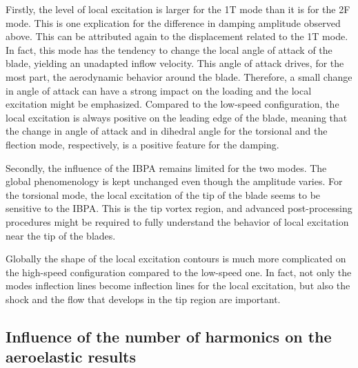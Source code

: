 Firstly, the level of local excitation is larger for the
1T mode than it is for the 2F mode. This is one explication
for the difference in damping amplitude observed above.
This can be attributed again to the displacement related to the
1T mode. In fact, this mode has the tendency to change the
local angle of attack of the blade, yielding an unadapted
inflow velocity. This angle of attack drives, for the most part,
the aerodynamic behavior around the blade. Therefore, a small
change in angle of attack can have a strong impact on the loading and
the local excitation might be emphasized.
Compared to the low-speed configuration, the local excitation
is always positive on the leading edge of the blade, meaning
that the change in angle of attack and in dihedral angle
for the torsional and the flection mode, respectively,
is a positive feature for the damping.

Secondly, the influence of the IBPA remains limited for the
two modes. The global phenomenology is
kept unchanged even though the amplitude varies.
For the torsional mode, the local excitation of
the tip of the blade seems to be sensitive 
to the IBPA. This is the tip vortex region, and
advanced post-processing procedures might be required
to fully understand the behavior of local excitation
near the tip of the blades.

Globally the shape of the local excitation contours
is much more complicated on the high-speed configuration
compared to the low-speed one. In fact, 
not only the modes inflection lines become inflection lines
for the local excitation, but also the shock and 
the flow that develops in the tip region are important.

\subsection{Influence of the number of harmonics on the aeroelastic results}
\label{sub:dream_hs_convergence_ael}

